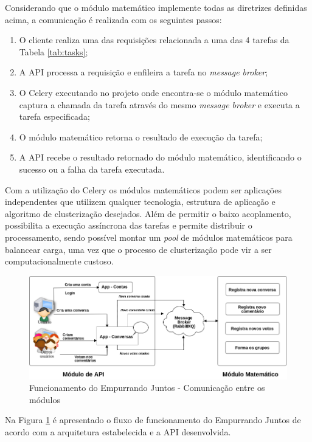 	Considerando que o módulo matemático implemente todas as diretrizes definidas acima, a comunicação é realizada com 
	os seguintes passos:
	  
	\begin{enumerate}
	\item O cliente realiza uma das requisições relacionada a uma das 4 tarefas da Tabela \ref{tab:tasks};
	\item A API processa a requisição e enfileira a tarefa no \textit{message broker};
	\item O Celery executando no projeto onde encontra-se o módulo matemático captura a chamada da tarefa através do mesmo \textit{message broker} e 
	executa a tarefa especificada;
	\item O módulo matemático retorna o resultado de execução da tarefa;
	\item A API recebe o resultado retornado do módulo matemático, identificando o sucesso ou a falha da tarefa executada.
	\end{enumerate}
 
	Com a utilização do Celery os módulos matemáticos podem ser aplicações independentes que utilizem qualquer tecnologia,
	estrutura de aplicação e algoritmo de clusterização desejados. Além de permitir o baixo acoplamento, possibilita
	a execução assíncrona das tarefas e permite distribuir o processamento, sendo possível montar um \textit{pool} de
	módulos matemáticos para balancear carga, uma vez que o processo de clusterização pode vir a ser computacionalmente custoso.
 
	\vfill
	\pagebreak
	\begin{figure}[bt!]
	\centering
	\includegraphics[scale=0.5]{figuras/resumo_ej_api.png}
	\caption{Funcionamento do Empurrando Juntos - Comunicação entre os módulos}
	\label{fig:resumo_ej_api}
	\end{figure}


	Na Figura \ref{fig:resumo_ej_api} é apresentado o fluxo de funcionamento do Empurrando Juntos de acordo com a arquitetura
	estabelecida e a API desenvolvida.
	
